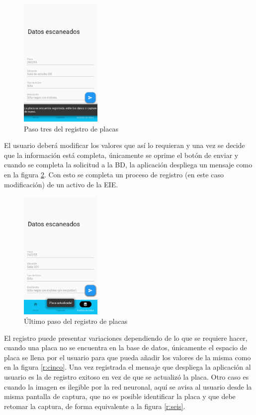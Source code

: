 \begin{figure}[ht]
    \centering
    \includegraphics[width=0.35\textwidth]{imagenes/resultados/tres.png}
    \caption{Paso tres del registro de placas}
    \label{r:tres}
\end{figure}
\par
El usuario deberá modificar los valores que así lo requieran y una vez se decide que la información está completa, únicamente se oprime el botón de enviar y cuando se completa la solicitud a la BD, la aplicación despliega un mensaje como en la figura \ref{r:cuatro}. Con esto se completa un proceso de registro (en este caso modificación) de un activo de la EIE. 
\begin{figure}[ht]
    \centering
    \includegraphics[width=0.35\textwidth]{imagenes/resultados/cuatro.png}
    \caption{Último paso del registro de placas}
    \label{r:cuatro}
\end{figure}
\par
El registro puede presentar variaciones dependiendo de lo que se requiere hacer, cuando una placa no se encuentra en la base de datos, únicamente el espacio de placa se llena por el usuario para que pueda añadir los valores de la misma como en la figura \ref{r:cinco}. Una vez registrada el mensaje que despliega la aplicación al usuario es la de registro exitoso en vez de que se actualizó la placa. Otro caso es cuando la imagen es ilegible por la red neuronal, aquí se avisa al usuario desde la misma pantalla de captura, que no es posible identificar la placa y que debe retomar la captura, de forma equivalente a la figura \ref{r:seis}.
